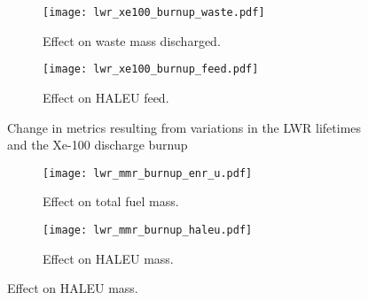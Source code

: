 \begin{figure}
    \ContinuedFloat    
    \begin{subfigure}[t]{0.48\textwidth}
        \centering
        \texttt{[image: lwr\_xe100\_burnup\_waste.pdf]}
        \caption{Effect on waste mass discharged.}
        \label{fig:lwr_xe100_burnup_waste}
    \end{subfigure}
    \hfill
    \begin{subfigure}[t]{0.48\textwidth}
        \centering
        \texttt{[image: lwr\_xe100\_burnup\_feed.pdf]}
        \caption{Effect on HALEU feed.}
        \label{fig:lwr_xe100_burnup_feed}
    \end{subfigure}
    \caption{Change in metrics resulting from variations in the 
    LWR lifetimes and the Xe-100 discharge burnup}
    \label{fig:lwr_xe100_burnup}
\end{figure}
\begin{figure}
    \begin{subfigure}[t]{0.48\textwidth}
        \centering
        \texttt{[image: lwr\_mmr\_burnup\_enr\_u.pdf]}
        \caption{Effect on total fuel mass.}
        \label{fig:lwr_mmr_burnup__enr_u}
    \end{subfigure}
    \hfill
    \begin{subfigure}[t]{0.48\textwidth}
        \centering
        \texttt{[image: lwr\_mmr\_burnup\_haleu.pdf]}
        \caption{Effect on HALEU mass.}
        \label{fig:lwr_mmr_burnup_haleu}
    \end{subfigure}
\end{figure}

